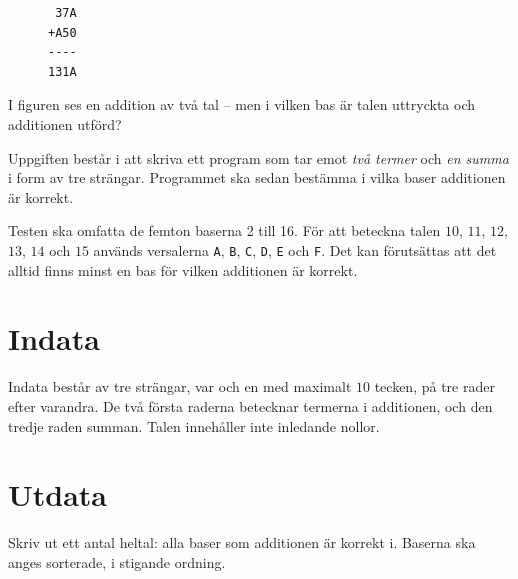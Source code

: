 
\begin{figure}
\centering
\begin{verbatim}
 37A
+A50
----
131A
\end{verbatim}
\end{figure}

I figuren ses en addition av två tal -- men i vilken bas är talen uttryckta och additionen utförd?

Uppgiften består i att skriva ett program som tar emot \emph{två termer} och \emph{en summa} i form
av tre strängar. Programmet ska sedan bestämma i vilka baser additionen är korrekt.

Testen ska omfatta de femton baserna 2 till 16. För att beteckna talen $10$, $11$, $12$, $13$, $14$ och $15$ används
versalerna \texttt{A}, \texttt{B}, \texttt{C}, \texttt{D}, \texttt{E} och \texttt{F}. Det kan förutsättas
att det alltid finns minst en bas för vilken additionen är korrekt.

\section*{Indata}
Indata består av tre strängar, var och en med maximalt $10$ tecken, på tre rader efter varandra.
De två första raderna betecknar termerna i additionen, och den tredje raden summan.
Talen innehåller inte inledande nollor.

\section*{Utdata}
Skriv ut ett antal heltal: alla baser som additionen är korrekt i.
Baserna ska anges sorterade, i stigande ordning.
